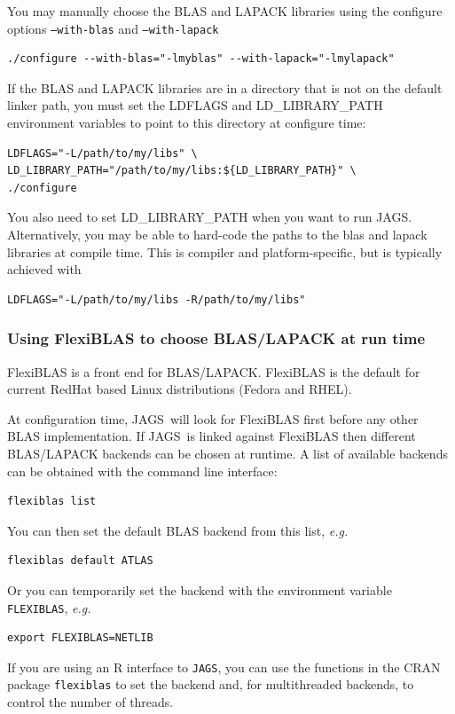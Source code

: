 \documentclass[11pt, a4paper, titlepage]{article}
\newcommand{\JAGS}{\textsf{JAGS}}
\newcommand{\code}[1]{{\bgroup{\normalfont\ttfamily #1}\egroup}}
\begin{document}
You may manually choose the BLAS and LAPACK libraries using the
configure options \texttt{--with-blas} and \texttt{--with-lapack}
\begin{verbatim}
./configure --with-blas="-lmyblas" --with-lapack="-lmylapack"
\end{verbatim}

If the BLAS and LAPACK libraries are in a directory that is not on the
default linker path, you must set the \code{LDFLAGS} and
\code{LD\_LIBRARY\_PATH} environment variables to point to this
directory at configure time:
\begin{verbatim}
LDFLAGS="-L/path/to/my/libs" \
LD_LIBRARY_PATH="/path/to/my/libs:${LD_LIBRARY_PATH}" \
./configure
\end{verbatim}

You also need to set \code{LD\_LIBRARY\_PATH} when you want to run
\JAGS.  Alternatively, you may be able to hard-code the paths to the
blas and lapack libraries at compile time. This is compiler and
platform-specific, but is typically achieved with
\begin{verbatim}
LDFLAGS="-L/path/to/my/libs -R/path/to/my/libs"
\end{verbatim}

\subsubsection{Using FlexiBLAS to choose BLAS/LAPACK at run time}

FlexiBLAS is a front end for BLAS/LAPACK. FlexiBLAS is the default for
current RedHat based Linux distributions (Fedora and RHEL).

At configuration time, \JAGS\ will look for FlexiBLAS first before any
other BLAS implementation.  If \JAGS\ is linked against FlexiBLAS then
different BLAS/LAPACK backends can be chosen at runtime. A list of
available backends can be obtained with the command line interface:
\begin{verbatim}
flexiblas list
\end{verbatim}
You can then set the default BLAS backend from this list, {\em e.g.}
\begin{verbatim}
flexiblas default ATLAS
\end{verbatim}
Or you can temporarily set the backend with the environment variable
\texttt{FLEXIBLAS}, {\em e.g.}
\begin{verbatim}
export FLEXIBLAS=NETLIB
\end{verbatim}
If you are using an R interface to \texttt{JAGS}, you can use the
functions in the CRAN package \texttt{flexiblas} to set the backend
and, for multithreaded backends, to control the number of threads.
\end{document}
